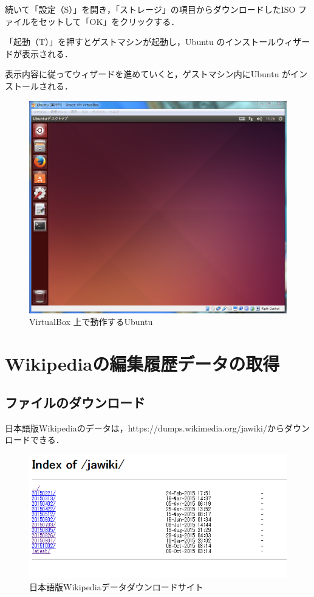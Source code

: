 続いて「設定（S）」を開き，「ストレージ」の項目からダウンロードしたISO ファイルをセットして「OK」をクリックする．

「起動（T）」を押すとゲストマシンが起動し，Ubuntu のインストールウィザードが表示される．

表示内容に従ってウィザードを進めていくと，ゲストマシン内にUbuntu がインストールされる．


\begin{figure}[H]
\centering
\includegraphics[width=14cm]{Ubuntu_on_VirtualBox.PNG}
\caption{VirtualBox 上で動作するUbuntu}\label{サンプル図}
\end{figure}


\section{Wikipediaの編集履歴データの取得}

\subsection{ファイルのダウンロード}

日本語版Wikipediaのデータは，https://dumps.wikimedia.org/jawiki/からダウンロードできる．

\begin{figure}[H]
\centering
\includegraphics[width=14cm]{Index_of_jawiki.PNG}
\caption{日本語版Wikipediaデータダウンロードサイト}\label{サンプル図}
\end{figure}


